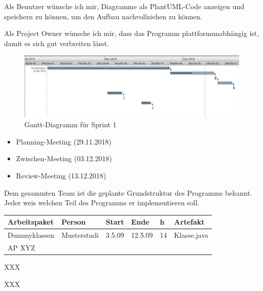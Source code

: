Als Benutzer wünsche ich mir, Diagramme als PlantUML-Code anzeigen und speichern zu können, um den Aufbau nachvollziehen zu können.
\nsecend

Als Project Owner wünsche ich mir, dass das Programm plattformunabhängig ist, damit es sich gut verbreiten lässt.
\nsecend
\nsecend %

\begin{figure}[hbtp]
\centering
\includegraphics[width=\textwidth]{Bilder/gantt}
\caption{Gantt-Diagramm für Sprint 1}
\end{figure}
\nsecend

\begin{itemize}
\item Planning-Meeting (29.11.2018)
\item Zwischen-Meeting (03.12.2018)
\item Review-Meeting (13.12.2018)
\end{itemize}
\nsecend

Dem gesammten Team ist die geplante Grundstruktur des Programms bekannt. Jeder weis welchen Teil des Programms er implementieren soll.
\nsecend

\begin{longtable}{|p{4cm}|l|l|l|l|l|}
        \hline
        Arbeitspaket & Person & Start & Ende & h & Artefakt\\
        \hline
        Dummyklassen & Musterstudi & 3.5.09 & 12.5.09 & 14 & Klasse.java\\ \hline
        AP XYZ &  &  &  & & \\ \hline
\end{longtable}     
\nsecend

XXX
\nsecend

XXX
\nsecend

